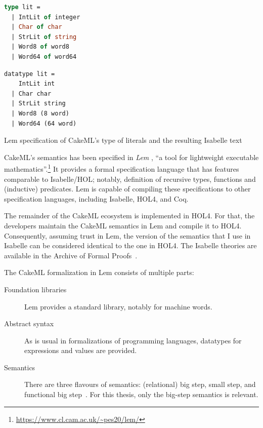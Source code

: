\begin{code}
  \centering
  \begin{subcode}{.4\linewidth}
    \begin{lstlisting}[language=ML]
type lit =
  | IntLit of integer
  | Char of char
  | StrLit of string
  | Word8 of word8
  | Word64 of word64\end{lstlisting}
  \end{subcode}
  \begin{subcode}{.4\linewidth}
    \begin{lstlisting}
datatype lit =
    IntLit int
  | Char char
  | StrLit string
  | Word8 (8 word)
  | Word64 (64 word)\end{lstlisting}
  \end{subcode}
  \caption{Lem specification of CakeML's type of literals and the resulting Isabelle text}
  \label{code:intro:cakeml:literals}
\end{code}

CakeML's semantics has been specified in \emph{Lem} \cite{mulligan2014lem}, ``a tool for lightweight executable mathematics''.\footnote{\url{https://www.cl.cam.ac.uk/~pes20/lem/}}
It provides a formal specification language that has features comparable to Isabelle/HOL; notably, definition of recursive types, functions and (inductive) predicates.
Lem is capable of compiling these specifications to other specification languages, including Isabelle, HOL4, and Coq.

The remainder of the CakeML ecosystem is implemented in HOL4.
For that, the developers maintain the CakeML semantics in Lem and compile it to HOL4.
Consequently, assuming trust in Lem, the version of the semantics that I use in Isabelle can be considered identical to the one in HOL4.
The Isabelle theories are available in the Archive of Formal Proofs~\cite{hupel2018cakeml}.

The CakeML formalization in Lem consists of multiple parts:
\begin{description}
  \item[Foundation libraries]
    Lem provides a standard library, notably for machine words.
  \item[Abstract syntax]
    As is usual in formalizations of programming languages, datatypes for expressions and values are provided.
  \item[Semantics]
    There are three flavours of semantics: (relational) big step, small step, and functional big step~\cite{owens2016functional}.
    For this thesis, only the big-step semantics is relevant.
\end{description}


